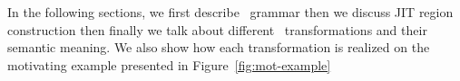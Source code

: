 In the following sections, we first describe \tool\ grammar then we discuss JIT region construction then
finally we talk about different \toolshort\ transformations and their semantic meaning. We also show how each
transformation is realized on the motivating example presented in Figure~\ref{fig:mot-example}
%
%
%
%

